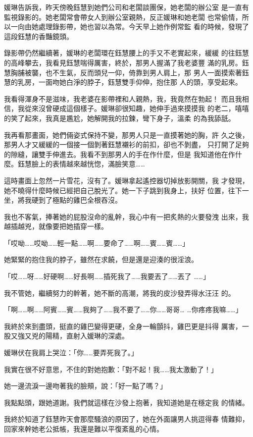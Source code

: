 媛琳告訴我，昨天傍晚鈺慧到她們公司和老闆談團保，她老闆的辦公室
是一直有監視錄影的。她老闆常會帶女人到辦公室親熱，反正媛琳和她老闆
也常偷情，所以一向由她處理錄影帶，她也習以為常。今天早上她作例常監
看的時候，發現了這段鈺慧的香豔鏡頭。

錄影帶仍然繼續著，媛琳的老闆環在鈺慧腰上的手又不老實起來，緩緩
的往鈺慧的高峰攀去，我看見鈺慧喘得厲害，終於，那男人握滿了我老婆豐
滿的乳房。鈺慧胸脯被襲，也不生氣，反而頭兒一仰，倚靠到男人肩上，那
男人一面摸索著鈺慧的乳房，一面吻她白淨的脖子，鈺慧雙手仰伸，抱住那
人的頭，享受起來。

我看得渾身不是滋味，我老婆在影帶裡和人親熱，我，我竟然在勃起！
而且我相信，我從來沒曾硬成這個樣子。媛琳卻很知趣，她伸手過來摸摸我
的老二，嘻嘻的笑了起來，我真是尷尬，她解開我的拉鍊，彎下身子，溫柔
的為我舔舐。

我再看那畫面，她們倆姿式保持不變，那男人只是一直摸著她的胸，許
久之後，那男人才又緩緩的一個接一個剝著鈺慧襯衫的前扣，卻也不剝盡，
只打開了足夠的隙縫，讓雙手伸進去。我看不到那男人的手在作什麼，但是
我知道他在作什麼。鈺慧臉上的表情越來越恍惚，滿臉笑意……

這時畫面上忽然一片雪花，沒有了。媛琳拿起遙控器切掉放影開關，我
才發現，她不曉得什麼時候已經把自己脫光了。她一下子跳到我身上，扶好
位置，往下一坐，將我硬到了極點的雞巴全根吞沒。

我也不客氣，捧著她的屁股沒命的亂幹，我心中有一把炙熱的火要發洩
出來，我越插越兇，就像要把她插穿一樣。

「哎呦……哎呦……輕一點……啊……要命了……啊……賓……賓……」

她緊緊的抱住我的脖子，雖然在求饒，但是還是迎湊的很淫浪。

「哎……呀……好硬啊……好長啊……插死我了……我要丟了……丟了
……」

我不管她，繼續努力的幹著，她不斷的高潮，將我的皮沙發弄得水汪汪
的。

「啊……啊……阿賓……賓……我夠了……我不要了……你……哥哥…
…你疼疼我嘛……」

我終於來到盡頭，挺直的雞巴變得更硬，全身一輪顫抖，雞巴更是抖得
厲害，一股又強又兇的陽精，直射入媛琳的深處。

媛琳伏在我肩上哭泣：「你……要弄死我了。」

我實在很不好意思，不住的對她抱歉：「對不起！我……我太激動了！」

她一邊流淚一邊吻著我的臉頰，說：「好一點了嗎？」

我點點頭，跟她道謝。我們就這樣在沙發上抱著，我知道她是在穩定我
的情緒。

我終於知道了鈺慧昨天會那麼騷浪的原因了，她在外面讓男人挑逗得春
情難抑，回家來幹她老公抵帳，我還是難以平復紊亂的心情。

